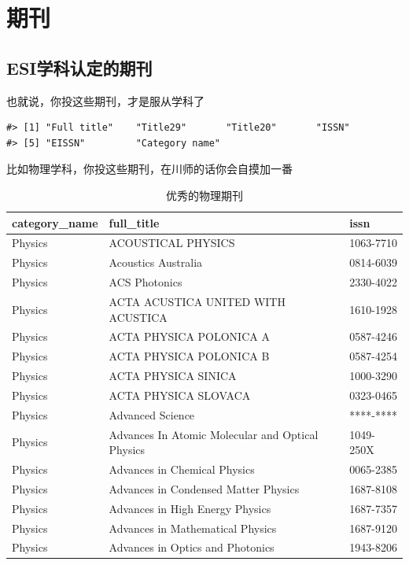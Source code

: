 \documentclass[cn, 11pt, fancy, hide]{elegantbook}
\begin{document}
\hypertarget{jcr}{%
\chapter{期刊}\label{jcr}}

\hypertarget{esiux5b66ux79d1ux8ba4ux5b9aux7684ux671fux520a}{%
\section{ESI学科认定的期刊}\label{esiux5b66ux79d1ux8ba4ux5b9aux7684ux671fux520a}}

也就说，你投这些期刊，才是服从学科了

\begin{verbatim}
#> [1] "Full title"    "Title29"       "Title20"       "ISSN"         
#> [5] "EISSN"         "Category name"
\end{verbatim}

比如物理学科，你投这些期刊，在川师的话你会自摸加一番

\begin{table}[!h]

\caption{\label{tab:unnamed-chunk-36}优秀的物理期刊}
\centering
\begin{tabular}[t]{lll}
\toprule
category\_name & full\_title & issn\\
\midrule
Physics & ACOUSTICAL PHYSICS & 1063-7710\\
Physics & Acoustics Australia & 0814-6039\\
Physics & ACS Photonics & 2330-4022\\
Physics & ACTA ACUSTICA UNITED WITH ACUSTICA & 1610-1928\\
Physics & ACTA PHYSICA POLONICA A & 0587-4246\\
\addlinespace
Physics & ACTA PHYSICA POLONICA B & 0587-4254\\
Physics & ACTA PHYSICA SINICA & 1000-3290\\
Physics & ACTA PHYSICA SLOVACA & 0323-0465\\
Physics & Advanced Science & ****-****\\
Physics & Advances In Atomic Molecular and Optical Physics & 1049-250X\\
\addlinespace
Physics & Advances in Chemical Physics & 0065-2385\\
Physics & Advances in Condensed Matter Physics & 1687-8108\\
Physics & Advances in High Energy Physics & 1687-7357\\
Physics & Advances in Mathematical Physics & 1687-9120\\
Physics & Advances in Optics and Photonics & 1943-8206\\
\bottomrule
\end{tabular}
\end{table}
\end{document}

